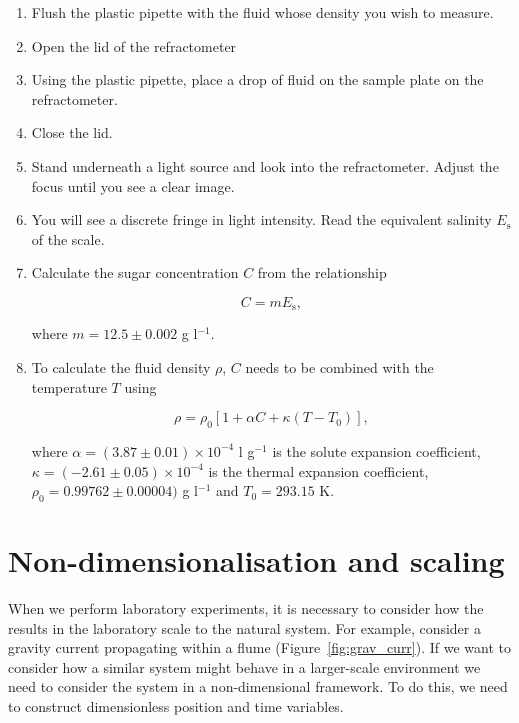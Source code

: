 \documentclass[]{article}
\theoremstyle{definition}
\begin{document}
\begin{enumerate}
\item Flush the plastic pipette with the fluid whose density you wish to measure. \\
\item Open the lid of the refractometer
\item Using the plastic pipette, place a drop of fluid on the sample plate on the refractometer. \\
\item Close the lid. \\
\item Stand underneath a light source and look into the refractometer. Adjust the focus until you see a clear image. \\
\item You will see a discrete fringe in light intensity. Read the equivalent salinity $E_{\text{s}}$ of the scale. \\
\item Calculate the sugar concentration $C$ from the relationship
  
  \begin{equation}
    \label{equ:equi_sal}
    C = m E_{\text{s}},
  \end{equation}

  where $m = 12.5 \pm 0.002$ g l$^{-1}$.
\item To calculate the fluid density $\rho$, $C$ needs to be combined with the temperature $T$ using

  \begin{equation}
    \label{equ:dens_model}
    \rho = \rho_{0} [1 + \alpha C+ \kappa (T - T_{0})],
  \end{equation}

  where $\alpha = (3.87 \pm 0.01) \times 10^{-4}$ l g$^{-1}$ is the solute expansion coefficient, $\kappa = (-2.61 \pm 0.05) \times 10^{-4}$ is the thermal expansion coefficient, $\rho_{0} = 0.99762 \pm 0.00004)$ g l$^{-1}$ and $T_{0} = 293.15$ K. 
\end{enumerate}

\section{Non-dimensionalisation and scaling}
\label{sec:non_dim}

When we perform laboratory experiments, it is necessary to consider how the results in the laboratory scale to the natural system. For example, consider a gravity current propagating within a flume (Figure~\ref{fig:grav_curr}). If we want to consider how a similar system might behave in a larger-scale environment we need to consider the system in a non-dimensional framework. To do this, we need to construct dimensionless position and time variables. 
\end{document}

